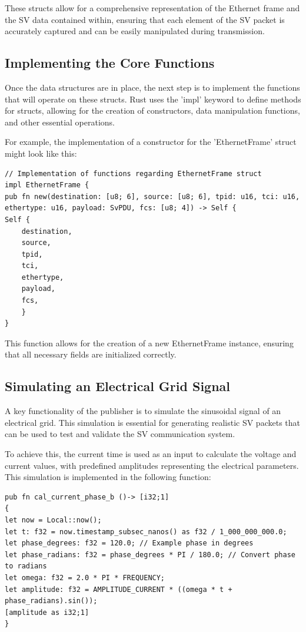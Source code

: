 These structs allow for a comprehensive representation of the Ethernet frame and the SV data contained within, ensuring that each element of the SV packet is accurately captured and can be easily manipulated during transmission.

\subsection{Implementing the Core Functions}

Once the data structures are in place, the next step is to implement the functions that will operate on these structs. Rust uses the 'impl' keyword to define methods for structs, allowing for the creation of constructors, data manipulation functions, and other essential operations.

For example, the implementation of a constructor for the 'EthernetFrame' struct might look like this:

\begin{lstlisting}[caption={How to implement an impl for the struct}]
// Implementation of functions regarding EthernetFrame struct
impl EthernetFrame {
pub fn new(destination: [u8; 6], source: [u8; 6], tpid: u16, tci: u16, ethertype: u16, payload: SvPDU, fcs: [u8; 4]) -> Self {
Self {
	destination,
	source,
	tpid,
	tci,
	ethertype,
	payload,
	fcs,
	}
}
\end{lstlisting}

This function allows for the creation of a new EthernetFrame instance, ensuring that all necessary fields are initialized correctly.

\subsection{Simulating an Electrical Grid Signal}

A key functionality of the publisher is to simulate the sinusoidal signal of an electrical grid. This simulation is essential for generating realistic SV packets that can be used to test and validate the SV communication system.

To achieve this, the current time is used as an input to calculate the voltage and current values, with predefined amplitudes representing the electrical parameters. This simulation is implemented in the following function:

\begin{lstlisting}[caption={How to calculate the value of the SV's}]
pub fn cal_current_phase_b ()-> [i32;1]
{
let now = Local::now();
let t: f32 = now.timestamp_subsec_nanos() as f32 / 1_000_000_000.0;
let phase_degrees: f32 = 120.0; // Example phase in degrees
let phase_radians: f32 = phase_degrees * PI / 180.0; // Convert phase to radians
let omega: f32 = 2.0 * PI * FREQUENCY;
let amplitude: f32 = AMPLITUDE_CURRENT * ((omega * t + phase_radians).sin());
[amplitude as i32;1]
}
\end{lstlisting}

